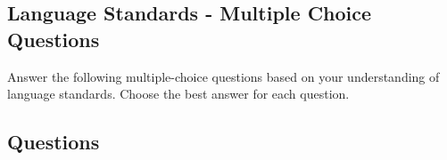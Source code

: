 \documentclass[12pt]{article}
\begin{document}
\onehalfspacing

\subsection*{Language Standards - Multiple Choice Questions}

\begin{tcolorbox}[colframe=black!40, colback=gray!5]
\begin{spacing}{1.15}

\noindent Answer the following multiple-choice questions based on your understanding of language standards. Choose the best answer for each question. 

\end{spacing}
\end{tcolorbox}

\subsection*{Questions}
\end{document}
